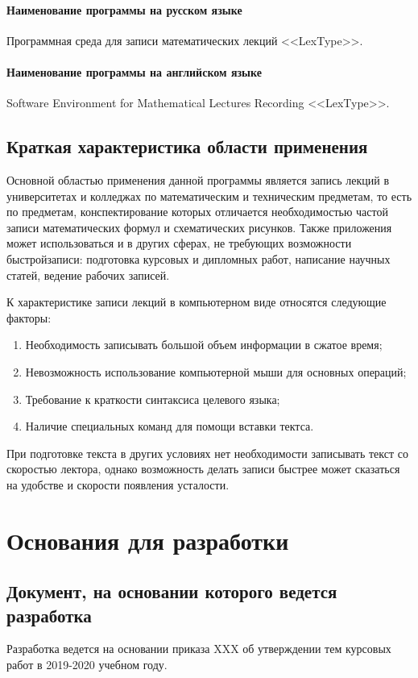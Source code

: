 \documentclass[techtask]{espd}
\begin{document}
\paragraph{Наименование программы на русском языке}
Программная среда для записи математических лекций <<LexType>>.
\paragraph{Наименование программы на английском языке}
Software Environment for Mathematical Lectures Recording <<LexType>>.

\subsection{Краткая характеристика области применения}
Основной областью применения данной программы является запись лекций в университетах и колледжах по математическим и техническим предметам, то есть по предметам, конспектирование которых отличается необходимостью частой записи математических формул и схематических рисунков. Также приложения может использоваться и в других сферах, не требующих возможности быстройзаписи: подготовка курсовых и дипломных работ, написание научных статей, ведение рабочих записей.

К характеристике записи лекций в компьютерном виде относятся следующие факторы:

\begin{enumerate}
\item Необходимость записывать большой объем информации в сжатое время;
\item Невозможность использование компьютерной мыши для основных операций;
\item Требование к краткости синтаксиса целевого языка;
\item Наличие специальных команд для помощи вставки тектса.
\end{enumerate}

При подготовке текста в других условиях нет необходимости записывать текст со скоростью лектора, однако возможность делать записи быстрее может сказаться на удобстве и скорости появления усталости.

\section{Основания для разработки}
\subsection{Документ, на основании которого ведется разработка}
Разработка ведется на основании приказа XXX об утверждении тем курсовых работ в 2019-2020 учебном году.
\end{document}

